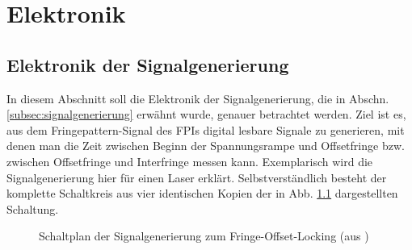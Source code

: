 \chapter{Elektronik}\label{anh:kap:elektronik}

\section{Elektronik der
Signalgenerierung}\label{anh:sec:signalgenerierung_elektronik} In diesem
Abschnitt soll die Elektronik der Signalgenerierung, die in Abschn. \ref{subsec:signalgenerierung} erwähnt wurde, genauer betrachtet werden.
Ziel ist es, aus dem Fringepattern-Signal des FPIs digital lesbare Signale zu
generieren, mit denen man die Zeit zwischen Beginn der
Spannungsrampe und Offsetfringe bzw. zwischen Offsetfringe
und Interfringe messen kann. Exemplarisch wird die Signalgenerierung hier
für einen Laser erklärt. Selbstverständlich besteht der komplette
Schaltkreis aus vier identischen Kopien der in Abb.
\ref{fig:signalgenerierung_schaltplan} dargestellten Schaltung.\par
\begin{figure}[h]
 	\centering
	\caption[Signalgenerierung - Schaltplan]{Schaltplan der
	Signalgenerierung zum
	Fringe-Offset-Locking (aus
	\cite{signalgenerierung})}\label{fig:signalgenerierung_schaltplan}
\end{figure}
